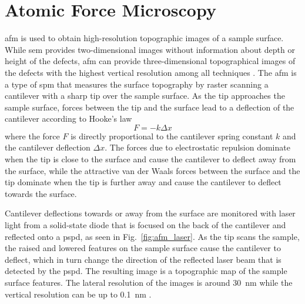 


\section{Atomic Force Microscopy}\label{sec:afm}
\Acf{afm} is used to obtain high-resolution topographic images of a sample surface. While \ac{sem} provides two-dimensional images without information about depth or height of the defects, \ac{afm} can provide three-dimensional topographical images of the defects with the highest vertical resolution among all techniques \citep{smith2013industrial}. The \ac{afm} is a type of \ac{spm} that measures the surface topography by raster scanning a cantilever with a sharp tip over the sample surface. As the tip approaches the sample surface, forces between the tip and the surface lead to a deflection of the cantilever according to Hooke's law \citep{bhushan1998handbook}
\begin{equation}
F = -k\Delta x
\end{equation}
where the force $F$ is directly proportional to the cantilever spring constant $k$ and the cantilever deflection $\Delta x$. The forces due to electrostatic repulsion dominate when the tip is close to the surface and cause the cantilever to deflect away from the surface, while the attractive van der Waals forces between the surface and the tip dominate when the tip is further away and cause the cantilever to deflect towards the surface.

Cantilever deflections towards or away from the surface are monitored with laser light from a solid-state diode that is focused on the back of the cantilever and reflected onto a \ac{pspd}, as seen in Fig.~\ref{fig:afm_laser}. As the tip scans the sample, the raised and lowered features on the sample surface cause the cantilever to deflect, which in turn change the direction of the reflected laser beam that is detected by the \ac{pspd}. The resulting image is a topographic map of the sample surface features. The lateral resolution of the images is around \SI{30}{\nano\metre} while the vertical resolution can be up to \SI{0.1}{\nano\metre} \citep{birdi2003scanning}.

